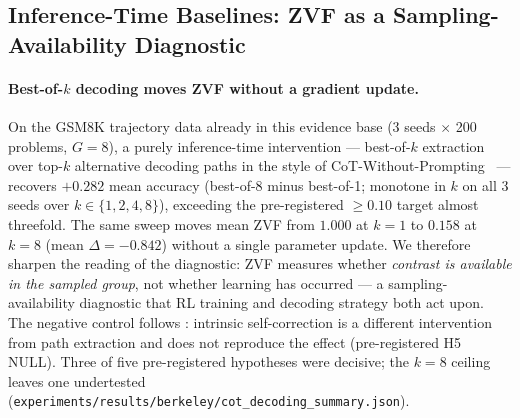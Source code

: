 \subsection{Inference-Time Baselines: ZVF as a Sampling-Availability Diagnostic}
\label{sec:zvf-inference-baselines}

\paragraph{Best-of-$k$ decoding moves ZVF without a gradient update.}
On the GSM8K trajectory data already in this evidence base (3 seeds
$\times$ 200 problems, $G{=}8$), a purely inference-time intervention ---
best-of-$k$ extraction over top-$k$ alternative decoding paths in the
style of CoT-Without-Prompting~\citep{wang2024cotdecoding} --- recovers
$+0.282$ mean accuracy (best-of-8 minus best-of-1; monotone in $k$ on
all 3 seeds over $k \in \{1,2,4,8\}$), exceeding the pre-registered
$\geq 0.10$ target almost threefold. The same sweep moves mean ZVF from
$1.000$ at $k{=}1$ to $0.158$ at $k{=}8$ (mean $\Delta = -0.842$)
without a single parameter update. We therefore sharpen the reading of
the diagnostic: ZVF measures whether \emph{contrast is available in the
sampled group}, not whether learning has occurred --- a sampling-availability
diagnostic that RL training and decoding strategy both act upon. The
negative control follows \citet{huang2024selfcorrect}: intrinsic
self-correction is a different intervention from path extraction and
does not reproduce the effect (pre-registered H5 NULL). Three of five
pre-registered hypotheses were decisive; the $k{=}8$ ceiling leaves one
undertested
(\texttt{experiments/results/berkeley/cot\_decoding\_summary.json}).

